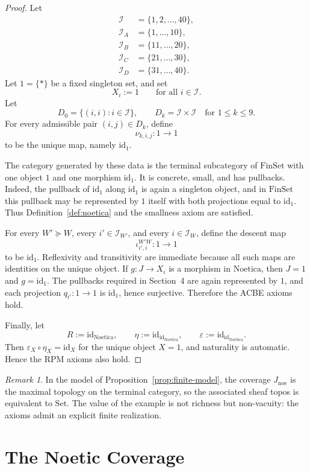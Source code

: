 \documentclass[11pt]{amsart}
\numberwithin{equation}{section}
\theoremstyle{definition}
\theoremstyle{remark}
\newtheorem{remark}[theorem]{Remark}
\newcommand{\Noetica}{\mathrm{Noetica}}
\newcommand{\FinSet}{\mathrm{FinSet}}
\newcommand{\id}{\mathrm{id}}
\newcommand{\I}{\mathcal{I}}
\newcommand{\IA}{\mathcal{I}_A}
\newcommand{\IB}{\mathcal{I}_B}
\newcommand{\IC}{\mathcal{I}_C}
\newcommand{\ID}{\mathcal{I}_D}
\newcommand{\Jnoe}{J_{\mathrm{noe}}}
\begin{document}
\begin{proof}
Let
\[
\begin{aligned}
\I&=\{1,2,\dots,40\},\\
\IA&=\{1,\dots,10\},\\
\IB&=\{11,\dots,20\},\\
\IC&=\{21,\dots,30\},\\
\ID&=\{31,\dots,40\}.
\end{aligned}
\]
Let \(1=\{\ast\}\) be a fixed singleton set, and set
\[
X_i:=1
\qquad
\text{for all } i\in \I.
\]
Let
\[
D_0=\{(i,i):i\in \I\},
\qquad
D_k=\I\times \I
\quad
\text{for } 1\leq k\leq 9.
\]
For every admissible pair \((i,j)\in D_k\), define
\[
\nu_{k,i,j}:1\to 1
\]
to be the unique map, namely \(\id_1\).

The category generated by these data is the terminal subcategory of \(\FinSet\) with one object \(1\) and one morphism \(\id_1\). It is concrete, small, and has pullbacks. Indeed, the pullback of \(\id_1\) along \(\id_1\) is again a singleton object, and in \(\FinSet\) this pullback may be represented by \(1\) itself with both projections equal to \(\id_1\). Thus Definition~\ref{def:noetica} and the smallness axiom are satisfied.

For every \(W'\succeq W\), every \(i'\in \I_{W'}\), and every \(i\in \I_W\), define the descent map
\[
\iota^{W'W}_{i',i}:1\to 1
\]
to be \(\id_1\). Reflexivity and transitivity are immediate because all such maps are identities on the unique object. If \(g:J\to X_i\) is a morphism in \(\Noetica\), then \(J=1\) and \(g=\id_1\). The pullbacks required in Section~4 are again represented by \(1\), and each projection \(q_{i'}:1\to 1\) is \(\id_1\), hence surjective. Therefore the ACBE axioms hold.

Finally, let
\[
R:=\id_{\Noetica},
\qquad
\eta:=\id_{\id_{\Noetica}},
\qquad
\varepsilon:=\id_{\id_{\Noetica}}.
\]
Then \(\varepsilon_X\circ \eta_X=\id_X\) for the unique object \(X=1\), and naturality is automatic. Hence the RPM axioms also hold.
\end{proof}

\begin{remark}
In the model of Proposition~\ref{prop:finite-model}, the coverage \(\Jnoe\) is the maximal topology on the terminal category, so the associated sheaf topos is equivalent to \(\mathrm{Set}\). The value of the example is not richness but non-vacuity: the axioms admit an explicit finite realization.
\end{remark}

\section{The Noetic Coverage}
\end{document}
